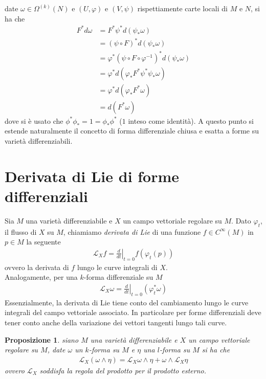 \documentclass[oneside, 11pt]{amsbook}
\makeatletter
\newcommand{\0}{{(0)}}
\newcommand{\3}{{(3)}}
\theoremstyle{colonplain}
\newtheorem{prop}[thm]{Proposizione}
\theoremstyle{colondefinition}
\theoremstyle{colonremark}
\numberwithin{equation}{chapter}
\renewcommand{\proofname}{Dimostrazione}
\renewenvironment{proof}[1][\proofname]{\par
  \pushQED{\qed}%
  \normalfont \topsep6\p@\@plus6\p@\relax
  \trivlist
  \item[\hskip\labelsep\bfseries #1:]\ignorespaces
}{%
  \popQED\endtrivlist\@endpefalse
}
\makeatother
\begin{document}
\begin{proof} date $\omega \in \Omega^{(k)}(N)$ e $(U, \varphi)$ e $(V, \psi)$ rispettiamente carte locali di $M$ e $N$, si ha che
\begin{align}
    F^*d\omega &= F^*\psi^*d(\psi_*\omega) \\
    &= (\psi \circ F)^*d(\psi_*\omega) \\
    &= \varphi^*(\psi \circ F \circ \varphi^{-1})^*d(\psi_*\omega) \\
    &= \varphi^*d(\varphi_*F^*\psi^*\psi_*\omega) \\
    &= \varphi^*d(\varphi_*F^*\omega) \\
    &= d(F^*\omega)
\end{align}
dove si è usato che $\phi^*\phi_* = 1 = \phi_*\phi^*$ ($1$ inteso come identità).
\end{proof}
A questo punto si estende naturalmente il concetto di forma differenziale chiusa e esatta a forme su varietà differenziabili.

\section{Derivata di Lie di forme differenziali}
Sia $M$ una varietà differenziabile e $X$ un campo vettoriale regolare su $M$. Dato $\varphi_t$, il flusso di $X$ su $M$, chiamiamo \textit{derivata di Lie} di una funzione $f \in C^\infty(M)$ in $p \in M$ la seguente
\begin{align}
    \mathcal{L}_Xf = \left.\frac{d}{dt}\right|_{t = 0}f(\varphi_t(p))
\end{align}
ovvero la derivata di $f$ lungo le curve integrali di $X$. \\
Analogamente, per una $k$-forma differenziale su $M$
\begin{align}
    \mathcal{L}_X\omega = \left.\frac{d}{dt}\right|_{t = 0}(\varphi^*_t\omega)
\end{align}
Essenzialmente, la derivata di Lie tiene conto del cambiamento lungo le curve integrali del campo vettoriale associato. In particolare per forme differenziali deve tener conto anche della variazione dei vettori tangenti lungo tali curve.
\begin{prop} siano $M$ una varietà differenziabile e $X$ un campo vettoriale regolare su $M$, date $\omega$ un $k$-forma su $M$ e $\eta$ una $l$-forma su $M$ si ha che
\begin{align}
    \mathcal{L}_X(\omega \wedge \eta) = \mathcal{L}_X\omega \wedge \eta + \omega \wedge \mathcal{L}_X\eta
\end{align}
ovvero $\mathcal{L}_X$ soddisfa la regola del prodotto per il prodotto esterno.
\end{prop}
\end{document}
